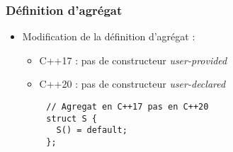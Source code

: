 \documentclass[C++.tex]{subfiles}
\begin{document}
\begin{frame}[fragile]
	\frametitle{Définition d'agrégat}
	\begin{itemize}
		\item Modification de la définition d'agrégat :
		\begin{itemize}
			\item C++17 : pas de constructeur \textit{user-provided}
			\item C++20 : pas de constructeur \textit{user-declared}

		\end{itemize}
	\end{itemize}

	\begin{verbatim}
		// Agregat en C++17 pas en C++20
		struct S {
		  S() = default;
		};
	\end{verbatim}

\end{frame}
\end{document}
